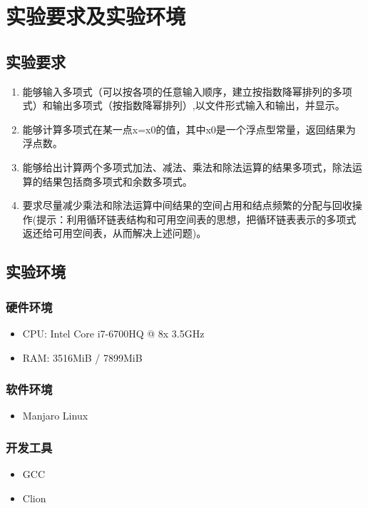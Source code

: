 \section{实验要求及实验环境}
\subsection{实验要求}
\begin{enumerate}
    \item 能够输入多项式（可以按各项的任意输入顺序，建立按指数降幂排列的多项式）和输出多项式（按指数降幂排列）,以文件形式输入和输出，并显示。
    \item 能够计算多项式在某一点x=x0的值，其中x0是一个浮点型常量，返回结果为浮点数。
    \item 能够给出计算两个多项式加法、减法、乘法和除法运算的结果多项式，除法运算的结果包括商多项式和余数多项式。
    \item 要求尽量减少乘法和除法运算中间结果的空间占用和结点频繁的分配与回收操作(提示：利用循环链表结构和可用空间表的思想，把循环链表表示的多项式返还给可用空间表，从而解决上述问题)。
\end{enumerate}


\subsection{实验环境}
\subsubsection{硬件环境}
\begin{itemize}
    \item CPU: Intel Core i7-6700HQ @ 8x 3.5GHz
    \item RAM: 3516MiB / 7899MiB
\end{itemize}

\subsubsection{软件环境}
\begin{itemize}
    \item Manjaro Linux
\end{itemize}

\subsubsection{开发工具}
\begin{itemize}
    \item GCC
    \item Clion
\end{itemize}